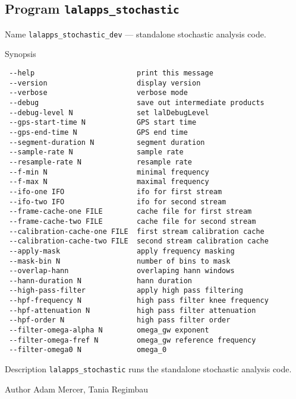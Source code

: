 \clearpage
\subsection{Program \texttt{lalapps\_stochastic}}
\label{program:lalapps-stochastic-dev}

\begin{entry}
\item[Name]
\verb$lalapps_stochastic_dev$ --- standalone stochastic analysis code.

\item[Synopsis]
\begin{verbatim}
 --help                        print this message
 --version                     display version
 --verbose                     verbose mode
 --debug                       save out intermediate products
 --debug-level N               set lalDebugLevel
 --gps-start-time N            GPS start time
 --gps-end-time N              GPS end time
 --segment-duration N          segment duration
 --sample-rate N               sample rate
 --resample-rate N             resample rate
 --f-min N                     minimal frequency
 --f-max N                     maximal frequency
 --ifo-one IFO                 ifo for first stream
 --ifo-two IFO                 ifo for second stream
 --frame-cache-one FILE        cache file for first stream
 --frame-cache-two FILE        cache file for second stream
 --calibration-cache-one FILE  first stream calibration cache
 --calibration-cache-two FILE  second stream calibration cache
 --apply-mask                  apply frequency masking
 --mask-bin N                  number of bins to mask
 --overlap-hann                overlaping hann windows
 --hann-duration N             hann duration
 --high-pass-filter            apply high pass filtering
 --hpf-frequency N             high pass filter knee frequency
 --hpf-attenuation N           high pass filter attenuation
 --hpf-order N                 high pass filter order
 --filter-omega-alpha N        omega_gw exponent
 --filter-omega-fref N         omega_gw reference frequency
 --filter-omega0 N             omega_0
\end{verbatim}

\item[Description] \verb$lalapps_stochastic$ runs the standalone
stochastic analysis code.

\item[Author] 
Adam Mercer, Tania Regimbau
\end{entry}
